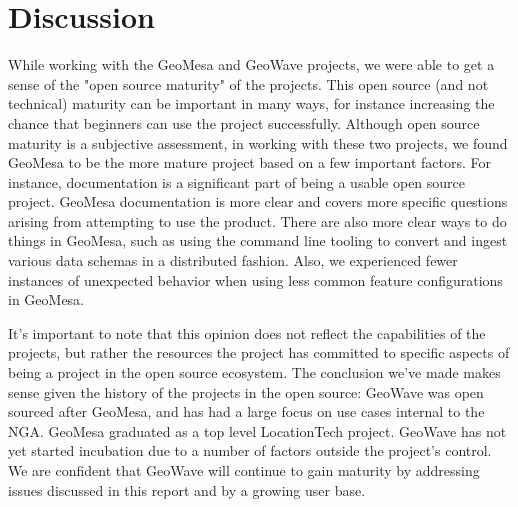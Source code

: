 \section{Discussion}
\label{sec:subjective}



While working with the GeoMesa and GeoWave projects, we were able to get a sense of the "open source maturity" of the projects. This open source (and not technical) maturity can be important in many ways, for instance increasing the chance that beginners can use the project successfully. Although open source maturity is a subjective assessment, in working with these two projects, we found GeoMesa to be the more mature project based on a few important factors. For instance, documentation is a significant part of being a usable open source project. GeoMesa documentation is more clear and covers more specific questions arising from attempting to use the product. There are also more clear ways to do things in GeoMesa, such as using the command line tooling to convert and ingest various data schemas in a distributed fashion. Also, we experienced fewer instances of unexpected behavior when using less common feature configurations in GeoMesa.

It's important to note that this opinion does not reflect the capabilities of the projects, but rather the resources the project has committed to specific aspects of being a project in the open source ecosystem. The conclusion we've made makes sense given the history of the projects in the open source: GeoWave was open sourced after GeoMesa, and has had a large focus on use cases internal to the NGA. GeoMesa graduated as a top level LocationTech project. GeoWave has not yet started incubation due to a number of factors outside the project's control. We are confident that GeoWave will continue to gain maturity by addressing issues discussed in this report and by a growing user base.







